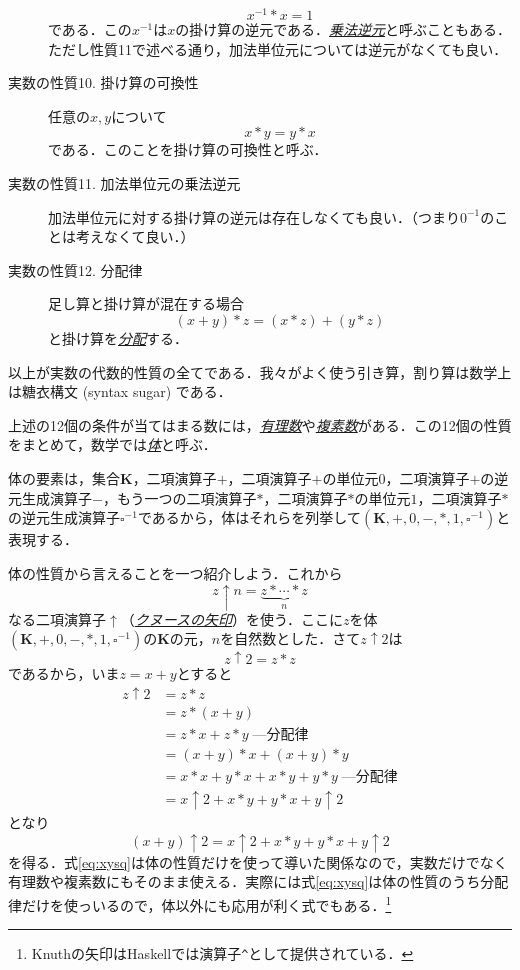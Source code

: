 \documentclass[a4paper]{jsbook}
\newcommand{\programminglanguage}[1]{\textsf{#1}}
\newcommand{\haskell}{\programminglanguage{Haskell}}
\newcommand{\keyword}[1]{{\underline{\emph{#1}}}}
\newcommand{\code}[1]{\texttt{#1}}
\newcommand{\mathSet}[1]{\mathbf{#1}} %
\newcommand{\mathSomething}{\square}  %
\newcommand{\mathField}[7]{(#1,#2,#3,#4,#5,#6,#7)}
\begin{document}
\begin{description}
\begin{equation}
x^{-1}*x=1
\end{equation}
である．この$x^{-1}$は$x$の掛け算の逆元である．\keyword{乗法逆元}と呼ぶこともある．ただし性質11で述べる通り，加法単位元については逆元がなくても良い．
\item[実数の性質10. 掛け算の可換性] 任意の$x,y$について
\begin{equation}
x*y=y*x
\end{equation}
である．このことを掛け算の可換性と呼ぶ．
\item[実数の性質11. 加法単位元の乗法逆元] 加法単位元に対する掛け算の逆元は存在しなくても良い．（つまり$0^{-1}$のことは考えなくて良い．）
\item[実数の性質12. 分配律] 足し算と掛け算が混在する場合
\begin{equation}
(x+y)*z=(x*z)+(y*z)
\end{equation}
と掛け算を\keyword{分配}する．
\end{description}
以上が実数の代数的性質の全てである．我々がよく使う引き算，割り算は数学上は糖衣構文 (syntax sugar) である．

上述の12個の条件が当てはまる数には，\keyword{有理数}や\keyword{複素数}がある．この12個の性質をまとめて，数学では\keyword{体}と呼ぶ．

体の要素は，集合$\mathSet{K}$，二項演算子$+$，二項演算子$+$の単位元$0$，二項演算子$+$の逆元生成演算子$-$，もう一つの二項演算子$*$，二項演算子$*$の単位元$1$，二項演算子$*$の逆元生成演算子$\mathSomething^{-1}$であるから，体はそれらを列挙して$\mathField{\mathSet{K}}{+}{0}{-}{*}{1}{\mathSomething^{-1}}$と表現する．

体の性質から言えることを一つ紹介しよう．これから
\begin{equation}
z\uparrow n=\underbrace{z*\dotsb*z}_n
\end{equation}
なる二項演算子$\uparrow$（\keyword{クヌースの矢印}）を使う．ここに$z$を体$\mathField{\mathSet{K}}{+}{0}{-}{*}{1}{\mathSomething^{-1}}$の$\mathSet{K}$の元，$n$を自然数とした．さて$z\uparrow2$は
\begin{equation}
z\uparrow2=z*z
\end{equation}
であるから，いま$z=x+y$とすると
\begin{align}
z\uparrow2&=z*z\\
&=z*(x+y)\\
&=z*x+z*y\;\text{---分配律}\\
&=(x+y)*x+(x+y)*y\\
&=x*x+y*x+x*y+y*y\;\text{---分配律}\\
&=x\uparrow2+x*y+y*x+y\uparrow2
\end{align}
となり
\begin{equation}
\label{eq:xysq}
(x+y)\uparrow2=x\uparrow2+x*y+y*x+y\uparrow2
\end{equation}
を得る．式\eqref{eq:xysq}は体の性質だけを使って導いた関係なので，実数だけでなく有理数や複素数にもそのまま使える．実際には式\eqref{eq:xysq}は体の性質のうち分配律だけを使っいるので，体以外にも応用が利く式でもある．\footnote{Knuthの矢印は\haskell では演算子\code{\^}として提供されている．}
\end{document}
